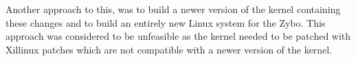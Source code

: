 Another approach to this, was to build a newer version of the kernel containing these changes and to build an entirely new Linux system for the Zybo.
This approach was considered to be unfeasible as the kernel needed to be patched with Xillinux patches which are not compatible with a newer version of the kernel.

